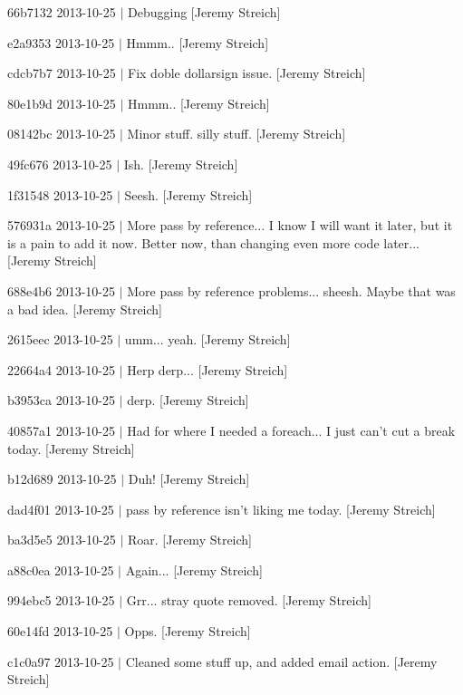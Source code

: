 \begin{DoxyItemize}
\item 66b7132 2013-\/10-\/25 $|$ Debugging \mbox{[}Jeremy Streich\mbox{]}
\item e2a9353 2013-\/10-\/25 $|$ Hmmm.. \mbox{[}Jeremy Streich\mbox{]}
\item cdcb7b7 2013-\/10-\/25 $|$ Fix doble dollarsign issue. \mbox{[}Jeremy Streich\mbox{]}
\item 80e1b9d 2013-\/10-\/25 $|$ Hmmm.. \mbox{[}Jeremy Streich\mbox{]}
\item 08142bc 2013-\/10-\/25 $|$ Minor stuff. silly stuff. \mbox{[}Jeremy Streich\mbox{]}
\item 49fc676 2013-\/10-\/25 $|$ Ish. \mbox{[}Jeremy Streich\mbox{]}
\item 1f31548 2013-\/10-\/25 $|$ Seesh. \mbox{[}Jeremy Streich\mbox{]}
\item 576931a 2013-\/10-\/25 $|$ More pass by reference... I know I will want it later, but it is a pain to add it now. Better now, than changing even more code later... \mbox{[}Jeremy Streich\mbox{]}
\item 688e4b6 2013-\/10-\/25 $|$ More pass by reference problems... sheesh. Maybe that was a bad idea. \mbox{[}Jeremy Streich\mbox{]}
\item 2615eec 2013-\/10-\/25 $|$ umm... yeah. \mbox{[}Jeremy Streich\mbox{]}
\item 22664a4 2013-\/10-\/25 $|$ Herp derp... \mbox{[}Jeremy Streich\mbox{]}
\item b3953ca 2013-\/10-\/25 $|$ derp. \mbox{[}Jeremy Streich\mbox{]}
\item 40857a1 2013-\/10-\/25 $|$ Had for where I needed a foreach... I just can't cut a break today. \mbox{[}Jeremy Streich\mbox{]}
\item b12d689 2013-\/10-\/25 $|$ Duh! \mbox{[}Jeremy Streich\mbox{]}
\item dad4f01 2013-\/10-\/25 $|$ pass by reference isn't liking me today. \mbox{[}Jeremy Streich\mbox{]}
\item ba3d5e5 2013-\/10-\/25 $|$ Roar. \mbox{[}Jeremy Streich\mbox{]}
\item a88c0ea 2013-\/10-\/25 $|$ Again... \mbox{[}Jeremy Streich\mbox{]}
\item 994ebc5 2013-\/10-\/25 $|$ Grr... stray quote removed. \mbox{[}Jeremy Streich\mbox{]}
\item 60e14fd 2013-\/10-\/25 $|$ Opps. \mbox{[}Jeremy Streich\mbox{]}
\item c1c0a97 2013-\/10-\/25 $|$ Cleaned some stuff up, and added email action. \mbox{[}Jeremy Streich\mbox{]}

\end{DoxyItemize}
